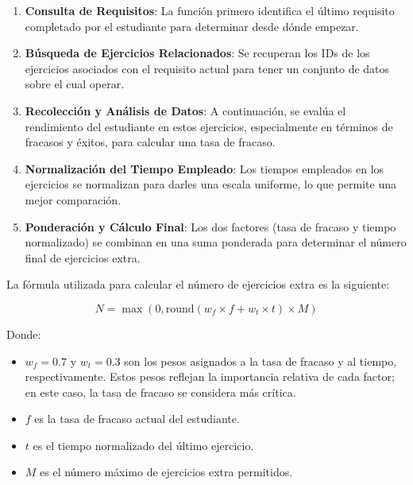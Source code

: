 \begin{enumerate}
    \item \textbf{Consulta de Requisitos}: La función primero identifica el último requisito completado por el estudiante para determinar desde dónde empezar.
    \item \textbf{Búsqueda de Ejercicios Relacionados}: Se recuperan los IDs de los ejercicios asociados con el requisito actual para tener un conjunto de datos sobre el cual operar.
    \item \textbf{Recolección y Análisis de Datos}: A continuación, se evalúa el rendimiento del estudiante en estos ejercicios, especialmente en términos de fracasos y éxitos, para calcular una tasa de fracaso.
    \item \textbf{Normalización del Tiempo Empleado}: Los tiempos empleados en los ejercicios se normalizan para darles una escala uniforme, lo que permite una mejor comparación.
    \item \textbf{Ponderación y Cálculo Final}: Los dos factores (tasa de fracaso y tiempo normalizado) se combinan en una suma ponderada para determinar el número final de ejercicios extra.
\end{enumerate}

La fórmula utilizada para calcular el número de ejercicios extra es la siguiente:

\begin{equation}
N = \max\left(0, \text{round}\left( w_f \times f + w_t \times t \right) \times M \right)
\end{equation}

Donde:

\begin{itemize}
    \item \texttt{\( w_f = 0.7 \)} y \texttt{\( w_t = 0.3 \)} son los pesos asignados a la tasa de fracaso y al tiempo, respectivamente. Estos pesos reflejan la importancia relativa de cada factor; en este caso, la tasa de fracaso se considera más crítica.
    \item \texttt{\( f \)} es la tasa de fracaso actual del estudiante.
    \item \texttt{\( t \)} es el tiempo normalizado del último ejercicio.
    \item \texttt{\( M \)} es el número máximo de ejercicios extra permitidos.
\end{itemize}

